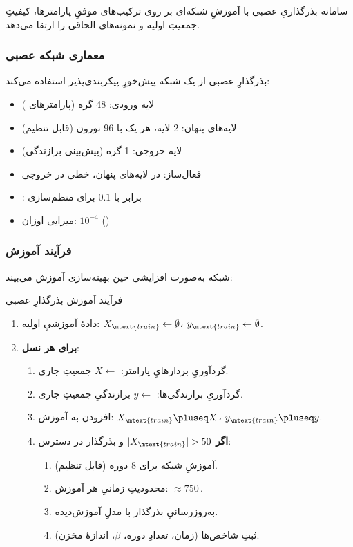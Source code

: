 سامانه بذرگذاریِ عصبی با آموزشِ شبکه‌ای بر روی ترکیب‌های موفقِ پارامترها، کیفیتِ جمعیتِ اولیه و نمونه‌های الحاقی را ارتقا می‌دهد.

\subsubsection{معماری شبکه عصبی}

بذرگذارِ عصبی از یک شبکه پیش‌خورِ پیکربندی‌پذیر استفاده می‌کند:
\begin{itemize}
\item لایه ورودی: 48 گره (پارامترهای )
\item لایه‌های پنهان: 2 لایه، هر یک با 96 نورون (قابل تنظیم)
\item لایه خروجی: 1 گره (پیش‌بینی برازندگی)
\item فعال‌ساز:  در لایه‌های پنهان، خطی در خروجی
\item {}: برابر با \(0.1\) برای منظم‌سازی
\item میرایی اوزان: \(10^{-4}\) ()
\end{itemize}

\subsubsection{فرآیند آموزش}

شبکه به‌صورت افزایشی حین بهینه‌سازی آموزش می‌بیند:
\begin{algorithm}
\caption{فرآیند آموزش بذرگذارِ عصبی}
\begin{enumerate}
  \item دادهٔ آموزشیِ اولیه: \(X_{\mtext{train}} \leftarrow \emptyset\)، \(y_{\mtext{train}} \leftarrow \emptyset\).
  \item \textbf{برای هر نسل}:
    \begin{enumerate}
      \item گردآوریِ بردارهایِ پارامتر: \(X \leftarrow\) جمعیتِ جاری.
      \item گردآوریِ برازندگی‌ها: \(y \leftarrow\) برازندگیِ جمعیتِ جاری.
      \item افزودن به آموزش: \(X_{\mtext{train}} \pluseq X\)، \(y_{\mtext{train}} \pluseq y\).
      \item \textbf{اگر} \(|X_{\mtext{train}}| > 50\) و بذرگذار در دسترس:
        \begin{enumerate}
          \item آموزشِ شبکه برای \(8\) دوره (قابل تنظیم).
          \item محدودیتِ زمانیِ هر آموزش: \(\approx 750\)\,.
          \item به‌روزرسانیِ بذرگذار با مدلِ آموزش‌دیده.
          \item ثبتِ شاخص‌ها (زمان، تعدادِ دوره، \(\beta\)، اندازهٔ مخزن).
        \end{enumerate}
    \end{enumerate}
\end{enumerate}
\end{algorithm}


